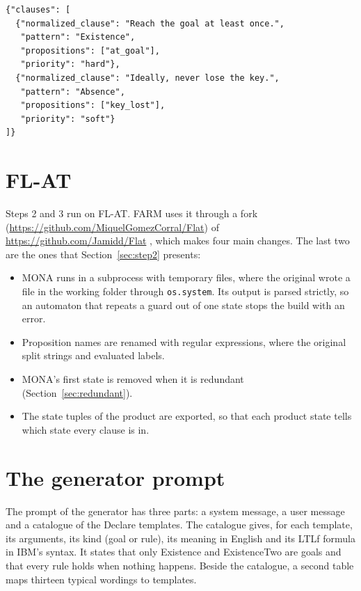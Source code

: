 \documentclass[11pt,english,listoffigures,listoftables]{tfgetsinf}
\newcommand{\runex}[1]{\textsc{#1}}  %
\begin{document}
\begin{lstlisting}[language={}, basicstyle=\ttfamily\footnotesize, upquote=true, caption={The answer of the generator for the \runex{careful key} example.}, label={lst:generator-answer}]
{"clauses": [
  {"normalized_clause": "Reach the goal at least once.",
   "pattern": "Existence",
   "propositions": ["at_goal"],
   "priority": "hard"},
  {"normalized_clause": "Ideally, never lose the key.",
   "pattern": "Absence",
   "propositions": ["key_lost"],
   "priority": "soft"}
]}
\end{lstlisting}

\section{FL-AT}
Steps 2 and 3 run on FL-AT. FARM uses it through a fork (\url{https://github.com/MiquelGomezCorral/Flat}) of \url{https://github.com/Jamidd/Flat} \cite{flat_code}, which makes four main changes. The last two are the ones that Section~\ref{sec:step2} presents:
\begin{itemize}
    \item MONA runs in a subprocess with temporary files, where the original wrote a file in the working folder through \texttt{os.system}. Its output is parsed strictly, so an automaton that repeats a guard out of one state stops the build with an error.
    \item Proposition names are renamed with regular expressions, where the original split strings and evaluated labels.
    \item MONA's first state is removed when it is redundant (Section~\ref{sec:redundant}).
    \item The state tuples of the product are exported, so that each product state tells which state every clause is in.
\end{itemize}

\section{The generator prompt}
\label{app:generator-prompt}
The prompt of the generator has three parts: a system message, a user message and a catalogue of the Declare templates. The catalogue gives, for each template, its arguments, its kind (goal or rule), its meaning in English and its LTLf formula in IBM's syntax. It states that only Existence and ExistenceTwo are goals and that every rule holds when nothing happens. Beside the catalogue, a second table maps thirteen typical wordings to templates.
\end{document}
